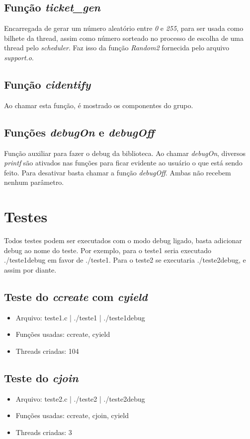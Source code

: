 \documentclass{article}
\begin{document}
\subsection{Função \textit{ticket\_gen}}
Encarregada de gerar um número aleatório entre \textit{0} e \textit{255}, para ser usada como bilhete da thread, assim como número sorteado no processo de escolha de uma thread pelo \textit{scheduler}. Faz isso da função \textit{Random2} fornecida pelo arquivo \textit{support.o}.

\subsection{Função \textit{cidentify}}
Ao chamar esta função, é mostrado os componentes do grupo.

\subsection{Funções \textit{debugOn} e \textit{debugOff}}
Função auxiliar para fazer o debug da biblioteca. Ao chamar \textit{debugOn}, diversos \textit{printf} são ativados nas funções para ficar evidente ao usuário o que está sendo feito. Para desativar basta chamar a função \textit{debugOff}. Ambas não recebem nenhum parâmetro.

\section{Testes}

Todos testes podem ser executados com o modo debug ligado, basta adicionar debug ao nome do teste. Por exemplo, para o teste1 seria executado ./teste1debug em favor de ./teste1. Para o teste2 se executaria ./teste2debug, e assim por diante.

\subsection{Teste do \textit{ccreate} com \textit{cyield}}
\begin{itemize}
\item Arquivo: teste1.c | ./teste1 | ./teste1debug
\item Funções usadas: ccreate, cyield
\item Threads criadas: 104
\end{itemize}

\subsection{Teste do \textit{cjoin}}
\begin{itemize}
\item Arquivo: teste2.c | ./teste2 | ./teste2debug
\item Funções usadas: ccreate, cjoin, cyield
\item Threads criadas: 3
\end{itemize}
\end{document}
